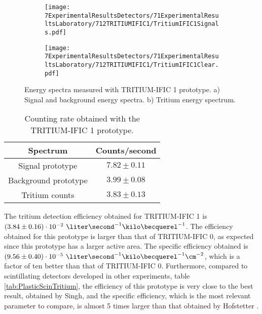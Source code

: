 \begin{figure}
\centering
    \begin{subfigure}[b]{1\textwidth}
    \centering
    \texttt{[image: 7ExperimentalResultsDetectors/71ExperimentalResultsLaboratory/712TRITIUMIFIC1/TritiumIFIC1Signals.pdf]}  
    \caption{\label{subfig:SignalBackgroundEnergySpectraTritiumIFIC1}}
    \end{subfigure}
    \hfill
    \begin{subfigure}[b]{1\textwidth}
    \centering
    \texttt{[image: 7ExperimentalResultsDetectors/71ExperimentalResultsLaboratory/712TRITIUMIFIC1/TritiumIFIC1Clear.pdf]}  
    \caption{\label{subfig:TritiumEnergySpectraTritiumIFIC1}}
    \end{subfigure}
 \caption{Energy spectra measured with TRITIUM-IFIC 1 prototype. a) Signal and background energy spectra. b) Tritium energy spectrum.}
 \label{fig:EnergySpectraTRITIUMIFIC1}
\end{figure}

\begin{table}[htbp]
\centering{}%
\begin{tabular}{cc}
\toprule 
Spectrum & Counts/second \tabularnewline
\midrule
\midrule 
Signal prototype & $7.82 \pm 0.11$ \tabularnewline
Background prototype & $3.99 \pm 0.08$ \tabularnewline  
Tritium counts & $3.83 \pm 0.13$ \tabularnewline
\bottomrule
\end{tabular}
\caption{Counting rate obtained with the TRITIUM-IFIC 1 prototype.}
\label{tab:CountsPerSecondTRITIUMIFIC1}
\end{table}

The tritium detection efficiency obtained for TRITIUM-IFIC 1 is $(3.84 \pm 0.16)\cdot{} 10^{-2}~\liter\second^{-1}\kilo\becquerel^{-1}$. The efficiency obtained for this prototype is larger than that of TRITIUM-IFIC 0, as expected since this prototype has a larger active area. The specific efficiency obtained is $(9.56 \pm 0.40)\cdot{} 10^{-5}~\liter\second^{-1}\kilo\becquerel^{-1}\cm^{-2}$, which is a factor of ten better than that of TRITIUM-IFIC 0. Furthermore, compared to scintillating detectors developed in other experiments, table \ref{tab:PlasticScinTritium}, the efficiency of this prototype is very close to the best result, obtained by Singh, and the specific efficiency, which is the most relevant parameter to compare, is almost 5 times larger than that obtained by Hofstetter \cite{Hofstetter1, Hofstetter2}.